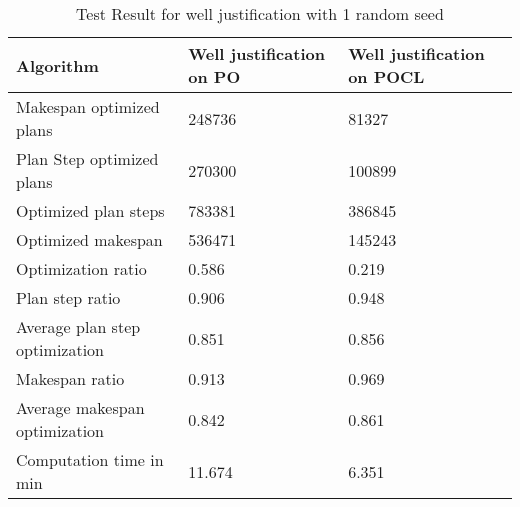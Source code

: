 \begin{table}[]
\begin{tabular}{lll}
\hline
Algorithm                 & Well justification on PO & Well justification on POCL \\ \hline
Makespan optimized plans  & 248736                   & 81327                      \\
Plan Step optimized plans & 270300                   & 100899                     \\
Optimized plan steps      & 783381                   & 386845                     \\
Optimized makespan        & 536471                   & 145243                     \\
Optimization ratio        & 0.586                    & 0.219                      \\
Plan step ratio           & 0.906                    & 0.948                      \\
Average plan step optimization & 0.851               & 0.856                           \\
Makespan ratio            & 0.913                    & 0.969                      \\
Average makespan optimization &0.842                 &0.861                        \\
Computation time in min   & 11.674                   & 6.351                      \\
\end{tabular}
\caption{Test Result for well justification with 1 random seed}
\end{table}


